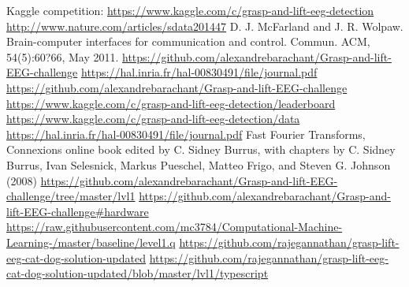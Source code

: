 \documentclass[final,leqno,onefignum,onetabnum]{siamltexmm}
\begin{document}
\begin{thebibliography}{1}
   Kaggle competition:  \url{https://www.kaggle.com/c/grasp-and-lift-eeg-detection}
   \url{http://www.nature.com/articles/sdata201447}
  D. J. McFarland and J. R. Wolpaw. Brain-computer interfaces for communication and control. Commun. ACM, 54(5):60?66, May 2011.
  \url{https://github.com/alexandrebarachant/Grasp-and-lift-EEG-challenge}
  \url{https://hal.inria.fr/hal-00830491/file/journal.pdf}
  \url{https://github.com/alexandrebarachant/Grasp-and-lift-EEG-challenge}
  \url{https://www.kaggle.com/c/grasp-and-lift-eeg-detection/leaderboard}
  \url{https://www.kaggle.com/c/grasp-and-lift-eeg-detection/data}
  \url{https://hal.inria.fr/hal-00830491/file/journal.pdf}
  Fast Fourier Transforms, Connexions online book edited by C. Sidney Burrus, with chapters by C. Sidney Burrus, Ivan Selesnick, Markus Pueschel, Matteo Frigo, and Steven G. Johnson (2008)
   \url{https://github.com/alexandrebarachant/Grasp-and-lift-EEG-challenge/tree/master/lvl1}
   \url{https://github.com/alexandrebarachant/Grasp-and-lift-EEG-challenge\#hardware}
   \url{https://raw.githubusercontent.com/mc3784/Computational-Machine-Learning-/master/baseline/level1.q}
   \url{https://github.com/rajegannathan/grasp-lift-eeg-cat-dog-solution-updated}
   \url{https://github.com/rajegannathan/grasp-lift-eeg-cat-dog-solution-updated/blob/master/lvl1/typescript}
\end{thebibliography} 
\end{document}
